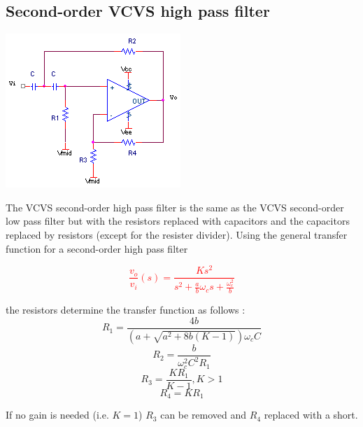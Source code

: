 \subsection{Second-order VCVS high pass filter}
\begin{center}
	\includegraphics{schematics/2ndorder_vcvs_HPfilter.PNG}
\end{center}
The VCVS second-order high pass filter is the same as the VCVS second-order low pass filter but with the resistors replaced with capacitors and the capacitors replaced by resistors (except for the resister divider). Using the  general transfer function for a second-order high pass filter

\textcolor{red}{
\begin{equation}
\frac{v_{o}}{v_{i}}(s) = \frac{Ks^{2}}{s^{2} + \frac{a}{b}\omega_{c}s + \frac{\omega_{c}^{2}}{b}}
\label{eq:2ndorder_vcvs_HPfilter}
\end{equation}
}

the resistors determine the transfer function as follows \autocite[130-131]{op-amp-circuits-johnson}:
\begin{equation}
R_1 = \frac{4b}{(a+\sqrt{a^2 + 8b(K-1)})\omega_{c}C}
\end{equation}
\begin{equation}
R_2 = \frac{b}{\omega_{c}^2 C^2 R_1}
\end{equation}
\begin{equation}
R_3 = \frac{KR_1}{K-1}, K > 1
\end{equation}
\begin{equation}
R_4 = KR_1
\end{equation}

If no gain is needed (i.e. $K = 1$) $R_3$ can be removed and $R_4$ replaced with a short.

